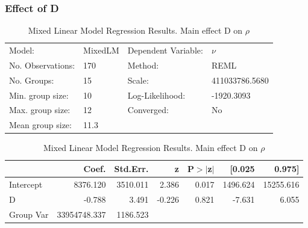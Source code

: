 \documentclass{article}
\begin{document}
\subsubsection{Effect of D}
\begin{table}
    \caption{Mixed Linear Model Regression Results. Main effect D on $\rho$}
    \label{}
    \begin{center}
    \begin{tabular}{llll}
    \hline
    Model:            & MixedLM & Dependent Variable: & $\nu$         \\
    No. Observations: & 170     & Method:             & REML            \\
    No. Groups:       & 15      & Scale:              & 411033786.5680  \\
    Min. group size:  & 10      & Log-Likelihood:     & -1920.3093      \\
    Max. group size:  & 12      & Converged:          & No              \\
    Mean group size:  & 11.3    &                     &                 \\
    \hline
    \end{tabular}
    \end{center}
    
    \begin{center}
    \begin{tabular}{lrrrrrr}
    \hline
              &        Coef. & Std.Err. &      z & P$> |$z$|$ &   [0.025 &    0.975]  \\
    \hline
    Intercept &     8376.120 & 3510.011 &  2.386 &       0.017 & 1496.624 & 15255.616  \\
    D         &       -0.788 &    3.491 & -0.226 &       0.821 &   -7.631 &     6.055  \\
    Group Var & 33954748.337 & 1186.523 &        &             &          &            \\
    \hline
    \end{tabular}
    \end{center}
    \end{table}
\end{document}
